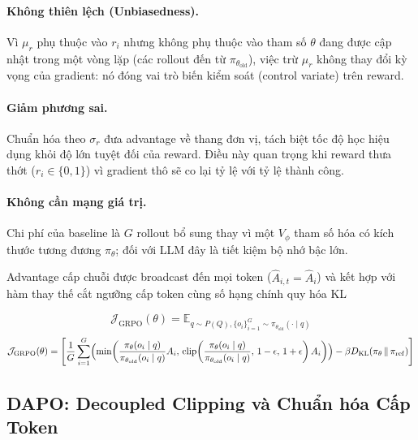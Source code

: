 \documentclass[11pt,a4paper]{article}
\begin{document}
\paragraph{Không thiên lệch (Unbiasedness).} Vì \(\mu_r\) phụ thuộc vào \(r_i\) nhưng không phụ thuộc vào
tham số \(\theta\) đang được cập nhật trong một vòng lặp (các rollout đến từ
\(\pi_{\theta_{\text{old}}}\)), việc trừ \(\mu_r\) không thay đổi kỳ vọng
của gradient: nó đóng vai trò biến kiểm soát (control variate) trên reward.

\paragraph{Giảm phương sai.} Chuẩn hóa theo \(\sigma_r\) đưa advantage về
thang đơn vị, tách biệt tốc độ học hiệu dụng khỏi độ lớn tuyệt đối của reward.
Điều này quan trọng khi reward thưa thớt (\(r_i\in\{0,1\}\)) vì
gradient thô sẽ co lại tỷ lệ với tỷ lệ thành công.

\paragraph{Không cần mạng giá trị.} Chi phí của baseline là \(G\) rollout bổ sung thay vì
một \(V_\phi\) tham số hóa có kích thước tương đương \(\pi_\theta\); đối với LLM đây là
tiết kiệm bộ nhớ bậc lớn.

Advantage cấp chuỗi được broadcast đến mọi token (\(\hat{A}_{i,t}=\hat{A}_i\))
và kết hợp với hàm thay thế cắt ngưỡng cấp token cùng số hạng chính quy hóa KL


\begin{equation}
\mathcal{J}_{\mathrm{GRPO}}(\theta) 
= \mathbb{E}_{q \sim P(Q), \{o_i\}_{i=1}^G \sim \pi_{\theta_{\mathrm{old}}}(\cdot \mid q)} 
\end{equation}
\begin{equation}
\mathcal{J}_{\mathrm{GRPO}}(\theta)  = 
\Biggl[
\frac{1}{G} \sum_{i=1}^G 
\Bigl(
\min\!\left(
\frac{\pi_\theta(o_i \mid q)}{\pi_{\theta_{\mathrm{old}}}(o_i \mid q)} A_i,\,
\text{clip}\!\left(\frac{\pi_\theta(o_i \mid q)}{\pi_{\theta_{\mathrm{old}}}(o_i \mid q)},\, 1-\epsilon,\, 1+\epsilon\right) A_i
\right)
\Bigr)
- \beta D_{\mathrm{KL}}\!\left(\pi_\theta \,\|\, \pi_{\mathrm{ref}}\right)
\Biggr]
\label{eq:grpo_full}
\end{equation}

\subsection{DAPO: Decoupled Clipping và Chuẩn hóa Cấp Token}\label{sec:dapo}
\end{document}
